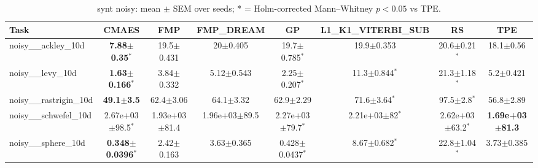 \begin{table}[t]
\caption{synt noisy: mean $\pm$ SEM over seeds; * = Holm-corrected Mann--Whitney $p<0.05$ vs TPE.}
\label{tab:synt_noisy}
\begin{center}\small
\begin{tabular}{lccccccc}
\hline
Task & CMAES & FMP & FMP\_DREAM & GP & L1\_K1\_VITERBI\_SUB & RS & TPE \\
\hline
noisy\_\_ackley\_10d & \textbf{7.88$\pm$0.35}$^{*}$ & 19.5$\pm$0.431 & 20$\pm$0.405 & 19.7$\pm$0.785$^{*}$ & 19.9$\pm$0.353 & 20.6$\pm$0.21$^{*}$ & 18.1$\pm$0.56 \\
noisy\_\_levy\_10d & \textbf{1.63$\pm$0.166}$^{*}$ & 3.84$\pm$0.332 & 5.12$\pm$0.543 & 2.25$\pm$0.207$^{*}$ & 11.3$\pm$0.844$^{*}$ & 21.3$\pm$1.18$^{*}$ & 5.2$\pm$0.421 \\
noisy\_\_rastrigin\_10d & \textbf{49.1$\pm$3.5} & 62.4$\pm$3.06 & 64.1$\pm$3.32 & 62.9$\pm$2.29 & 71.6$\pm$3.64$^{*}$ & 97.5$\pm$2.8$^{*}$ & 56.8$\pm$2.89 \\
noisy\_\_schwefel\_10d & 2.67e+03$\pm$98.5$^{*}$ & 1.93e+03$\pm$81.4 & 1.96e+03$\pm$89.5 & 2.27e+03$\pm$79.7$^{*}$ & 2.21e+03$\pm$82$^{*}$ & 2.62e+03$\pm$63.2$^{*}$ & \textbf{1.69e+03$\pm$81.3} \\
noisy\_\_sphere\_10d & \textbf{0.348$\pm$0.0396}$^{*}$ & 2.42$\pm$0.163 & 3.63$\pm$0.365 & 0.428$\pm$0.0437$^{*}$ & 8.67$\pm$0.682$^{*}$ & 22.8$\pm$1.04$^{*}$ & 3.73$\pm$0.385 \\
\hline
\end{tabular}
\end{center}
\end{table}